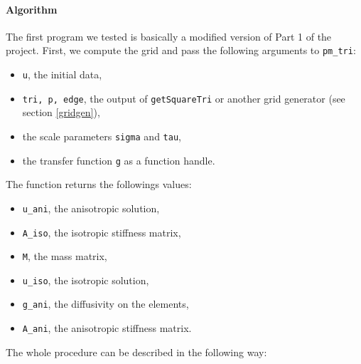 \documentclass{report}
\begin{document}
\paragraph{Algorithm}

The first program we tested is basically a modified version of Part 1 of the project. First, we compute the grid and pass the following arguments to \texttt{pm\_tri}:
\begin{itemize}
    \item
    \texttt{u}, the initial data,
    
    \item 
    \texttt{tri, p, edge}, the output of \texttt{getSquareTri} or another grid generator (see section
     \ref{gridgen}),
     
    \item
    the scale parameters \texttt{sigma} and \texttt{tau},
    
    \item
    the transfer function \texttt{g} as a function handle.
\end{itemize}
The function returns the followings values:
\begin{itemize}
    \item 
    \texttt{u\_ani}, the anisotropic solution,
    \item
    \texttt{A\_iso}, the isotropic stiffness matrix,
    \item
    \texttt{M}, the mass matrix,
    \item
    \texttt{u\_iso}, the isotropic solution,
    \item
    \texttt{g\_ani}, the diffusivity on the elements,
    \item
    \texttt{A\_ani}, the anisotropic stiffness matrix.
\end{itemize}
The whole procedure can be described in the following way:
\end{document}
